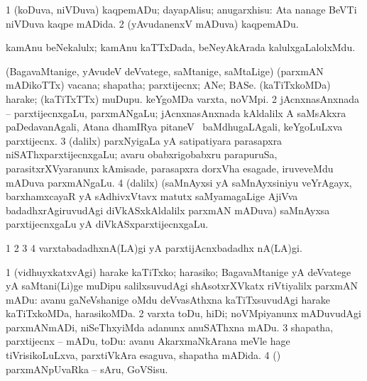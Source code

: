 {{{{{{{{{{{{{{\bentry 
{} 
\gl{\sakirx}
\expl{}
\bmng
\bnum
\num{1} (koDuva, niVDuva) kaqpemADu; dayapAlisu; anugarxhisu:  Ata nanage BeVTi niVDuva kaqpe mADida. 
\num{2} (yAvudanenxV mADuva) kaqpemADu. 
\enum
\emng
\eentry

\bentry 
{} 
\gl{\nA}
\expl{}
\bmng
 kamAnu beNekalulx; kamAnu kaTTxDada, beNeyAkArada kalulxgaLalolxMdu. 
\emng
\eentry

\bentry 
{} 
\gl{\nA}
\expl{}
\bmng
\bnum
{} (BagavaMtanige, yAvudeV deVvatege, saMtanige, saMtaLige) 
\banum
{} (parxmAN mADikoTTx) vacana; shapatha; parxtijecnx; ANe; BASe. 
 (kaTiTxkoMDa) harake; (kaTiTxTTx) muDupu. 
 keYgoMDa varxta, noVMpi. 
\hypertarget{vow(1)2}{} 
\eanum
\numie
\num{2} jAcnxnasAnxnada -- parxtijecnxgaLu, parxmANgaLu; jAcnxnasAnxnada kAldalilx A saMsAkxra paDedavanAgali, Atana dhamIRya pitaneV \mo\ baMdhugaLAgali, keYgoLuLxva parxtijecnx. 
\hypertarget{vow(1)3}{} 
\num{3} (\bava dalilx) parxNyigaLa yA satipatiyara parasapxra niSAThxparxtijecnxgaLu; avaru obabxrigobabxru parapuruSa, parasitxrXVyaranunx kAmisade, parasapxra dorxVha esagade, iruveveMdu mADuva parxmANgaLu. 
\hypertarget{vow(1)4}{} 
\num{4} (\bava dalilx) (saMnAyxsi yA saMnAyxsiniyu veYrAgayx, barxhamxcayaR yA sAdhivxVtavx matutx saMyamagaLige AjiVva badadhxrAgiruvudAgi diVkASxkAldalilx parxmAN mADuva) saMnAyxsa parxtijecnxgaLu yA diVkASxparxtijecnxgaLu. 
\enum
\emng

\noindent 
\gl{\pagu}
\expl{}
\bmng
\bnum
\num{1}  
\num{2}  
\num{3}  
\num{4}  varxtabadadhxnA(LA)gi yA parxtijAcnxbadadhx nA(LA)gi. 
\enum
\emng
\eentry

\bentry
{} 
\pron{}
\gl{\sakirx}
\expl{}
\bmng
\bnum
\num{1} (vidhuyxkatxvAgi) harake kaTiTxko; harasiko; BagavaMtanige yA deVvatege yA saMtani(Li)ge muDipu salilxsuvudAgi shAsotxrXVkatx riVtiyalilx parxmAN mADu:  avanu gaNeVshanige oMdu deVvasAthxna kaTiTxsuvudAgi harake kaTiTxkoMDa, harasikoMDa. 
\num{2} varxta toDu, hiDi; noVMpiyanunx mADuvudAgi parxmANmADi, niSeThxyiMda adanunx anuSAThxna mADu. 
\num{3} shapatha, parxtijecnx -- mADu, toDu:  avanu AkarxmaNkArana meVle hage tiVrisikoLuLxva, parxtiVkAra esaguva, shapatha mADida. 
\num{4} (\pArxparx) parxmANpUvaRka -- sAru, GoVSisu. 
\enum
\emng
\eentry

}}}}}}}}}}}}}}
